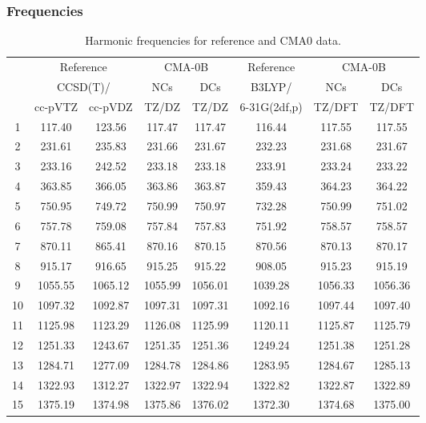\documentclass[10pt,oneside]{article}
\begin{document}
\clearpage

\subsubsection*{Frequencies}
\begin{table}[h!]
\centering
\caption{Harmonic frequencies for reference and CMA0 data.}
\begin{tabular}{cccccccc}
\toprule
{} & \multicolumn{2}{c}{Reference} & \multicolumn{2}{c}{CMA-0B} &    Reference & \multicolumn{2}{c}{CMA-0B} \\
{} & \multicolumn{2}{c}{CCSD(T)/} &     NCs &     DCs &       B3LYP/ &     NCs &     DCs \\
{} &   cc-pVTZ & cc-pVDZ &   TZ/DZ &   TZ/DZ & 6-31G(2df,p) &  TZ/DFT &  TZ/DFT \\
\midrule
1  &    117.40 &  123.56 &  117.47 &  117.47 &       116.44 &  117.55 &  117.55 \\
2  &    231.61 &  235.83 &  231.66 &  231.67 &       232.23 &  231.68 &  231.67 \\
3  &    233.16 &  242.52 &  233.18 &  233.18 &       233.91 &  233.24 &  233.22 \\
4  &    363.85 &  366.05 &  363.86 &  363.87 &       359.43 &  364.23 &  364.22 \\
5  &    750.95 &  749.72 &  750.99 &  750.97 &       732.28 &  750.99 &  751.02 \\
6  &    757.78 &  759.08 &  757.84 &  757.83 &       751.92 &  758.57 &  758.57 \\
7  &    870.11 &  865.41 &  870.16 &  870.15 &       870.56 &  870.13 &  870.17 \\
8  &    915.17 &  916.65 &  915.25 &  915.22 &       908.05 &  915.23 &  915.19 \\
9  &   1055.55 & 1065.12 & 1055.99 & 1056.01 &      1039.28 & 1056.33 & 1056.36 \\
10 &   1097.32 & 1092.87 & 1097.31 & 1097.31 &      1092.16 & 1097.44 & 1097.40 \\
11 &   1125.98 & 1123.29 & 1126.08 & 1125.99 &      1120.11 & 1125.87 & 1125.79 \\
12 &   1251.33 & 1243.67 & 1251.35 & 1251.36 &      1249.24 & 1251.38 & 1251.28 \\
13 &   1284.71 & 1277.09 & 1284.78 & 1284.86 &      1283.95 & 1284.67 & 1285.13 \\
14 &   1322.93 & 1312.27 & 1322.97 & 1322.94 &      1322.82 & 1322.87 & 1322.89 \\
15 &   1375.19 & 1374.98 & 1375.86 & 1376.02 &      1372.30 & 1374.68 & 1375.00 \\

\end{tabular}
\end{table}
\end{document}
